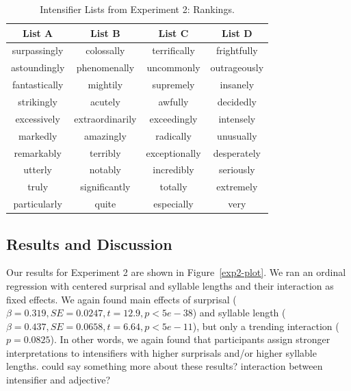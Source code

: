 \documentclass[10pt,letterpaper]{article}
\newcommand{\todo}[1]{{\color{red}#1}}
\begin{document}
\begin{table}[ht]
\begin{center} 
\footnotesize
\caption{Intensifier Lists from Experiment 2: Rankings.} 
\label{exp2-intensifiers} 
\vskip 0.12in
\begin{tabular}{cccc} 
\hline
List A    &  List B & List C & List D \\
\hline
surpassingly & colossally & terrifically & frightfully \\
astoundingly & phenomenally & uncommonly & outrageously \\
fantastically & mightily & supremely & insanely \\
strikingly & acutely & awfully & decidedly \\
excessively & extraordinarily & exceedingly & intensely \\
markedly & amazingly & radically & unusually \\
remarkably & terribly & exceptionally & desperately \\
utterly & notably & incredibly & seriously \\
truly & significantly & totally & extremely \\
particularly & quite & especially & very
\end{tabular}
\end{center}
\end{table}

\subsection{Results and Discussion}


Our results for Experiment 2 are shown in Figure~\ref{exp2-plot}. We ran an ordinal
regression with centered surprisal and syllable lengths and their interaction as fixed effects.
We again found main effects of surprisal ($\beta=0.319, SE=0.0247, t=12.9, p<5e-38$) and syllable length ($\beta=0.437, SE=0.0658, t=6.64, p<5e-11$), but only a trending interaction ($p=0.0825$).
In other words, we again found that participants assign stronger interpretations to intensifiers with higher surprisals and/or higher syllable lengths.
\todo{could say something more about these results? interaction between intensifier and adjective?}
\end{document}
